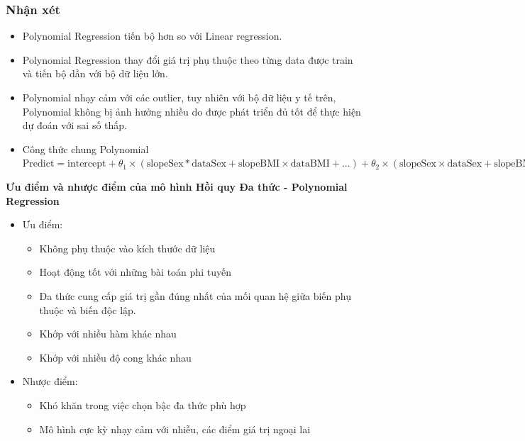 \documentclass{article}
\begin{document}
	\subsubsection{Nhận xét}
	\begin{itemize}
		\item Polynomial Regression tiến bộ hơn so với Linear regression.
		\item Polynomial Regression thay đổi giá trị phụ thuộc theo từng data được train và tiến bộ dần với bộ dữ liệu lớn.
		\item Polynomial nhạy cảm với các outlier, tuy nhiên với bộ dữ liệu y tế trên, Polynomial không bị ảnh hưởng nhiều do được phát triển đủ tốt để thực hiện dự đoán với sai số thấp.
		\item Công thức chung Polynomial $\text{Predict} = \text{intercept} + \theta_1 \times (\text{slopeSex} * \text{dataSex} + \text{slopeBMI} \times \text{dataBMI} + ... ) + \theta_2 \times (\text{slopeSex} \times \text{dataSex} + \text{slopeBMI} \times \text{dataBMI} + ... ) + \theta_3 * (\text{slopeSex} \times \text{dataSex} + \text{slopeBMI} \times \text{dataBMI} + ... )$
	\end{itemize}
	\textbf{Ưu điểm và nhược điểm của mô hình Hồi quy Đa thức - Polynomial Regression}
	\begin{itemize}
		\item Ưu điểm:
		\begin{itemize}
			\item Không phụ thuộc vào kích thước dữ liệu
			\item Hoạt động tốt với những bài toán phi tuyến
			\item Đa thức cung cấp giá trị gần đúng nhất của mối quan hệ giữa biến phụ thuộc và biến độc lập.
			\item Khớp với nhiều hàm khác nhau
			\item Khớp với nhiều độ cong khác nhau
		\end{itemize}
		\item Nhược điểm:
		\begin{itemize}
			\item Khó khăn trong việc chọn bậc đa thức phù hợp
			\item Mô hình cực kỳ nhạy cảm với nhiễu, các điểm giá trị ngoại lai
		\end{itemize}
	\end{itemize}
\end{document}
